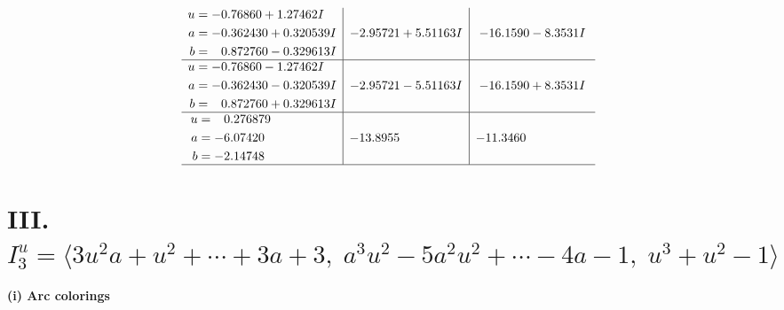 \documentclass[1p]{elsarticle_modified}
\theoremstyle{definition}
\begin{document}
$$\begin{array}{c|c|c}
\begin{aligned}
u &= -0.76860 + 1.27462 I \\
a &= -0.362430 + 0.320539 I \\
b &= \phantom{-}0.872760 - 0.329613 I\end{aligned}
 & -2.95721 + 5.51163 I & -16.1590 - 8.3531 I \\ \hline\begin{aligned}
u &= -0.76860 - 1.27462 I \\
a &= -0.362430 - 0.320539 I \\
b &= \phantom{-}0.872760 + 0.329613 I\end{aligned}
 & -2.95721 - 5.51163 I & -16.1590 + 8.3531 I \\ \hline\begin{aligned}
u &= \phantom{-}0.276879\phantom{ +0.000000I} \\
a &= -6.07420\phantom{ +0.000000I} \\
b &= -2.14748\phantom{ +0.000000I}\end{aligned}
 & -13.8955\phantom{ +0.000000I} & -11.3460\phantom{ +0.000000I}\\
 \hline 
 \end{array}$$\newpage\newpage\renewcommand{\arraystretch}{1}
\centering \section*{III. $I^u_{3}= \langle 3 u^2 a+u^2+\cdots+3 a+3,\;a^3 u^2-5 a^2 u^2+\cdots-4 a-1,\;u^3+u^2-1 \rangle$}
\flushleft \textbf{(i) Arc colorings}\\
\end{document}
